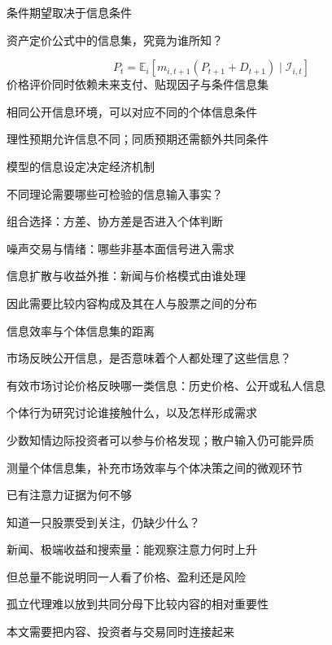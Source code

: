 \documentclass[11pt,compress]{beamer}
\begin{document}
\begin{frame}{条件期望取决于信息条件}\relax
{\small\color{tsinghua}资产定价公式中的信息集，究竟为谁所知？\par}\medskip
\begin{equation*}P_t=\mathbb E_i[m_{i,t+1}(P_{t+1}+D_{t+1})\mid\mathcal I_{i,t}]\end{equation*}\medskip
价格评价同时依赖未来支付、贴现因子与条件信息集\par\medskip
相同公开信息环境，可以对应不同的个体信息条件\par\medskip
理性预期允许信息不同；同质预期还需额外共同条件\par\medskip
{}
\end{frame}
\begin{frame}{模型的信息设定决定经济机制}\relax
{\small\color{tsinghua}不同理论需要哪些可检验的信息输入事实？\par}\medskip
组合选择：方差、协方差是否进入个体判断\par\medskip
噪声交易与情绪：哪些非基本面信号进入需求\par\medskip
信息扩散与收益外推：新闻与价格模式由谁处理\par\medskip
因此需要比较内容构成及其在人与股票之间的分布\par\medskip
{}
\end{frame}
\begin{frame}{信息效率与个体信息集的距离}\relax
{\small\color{tsinghua}市场反映公开信息，是否意味着个人都处理了这些信息？\par}\medskip
有效市场讨论价格反映哪一类信息：历史价格、公开或私人信息\par\medskip
个体行为研究讨论谁接触什么，以及怎样形成需求\par\medskip
少数知情边际投资者可以参与价格发现；散户输入仍可能异质\par\medskip
测量个体信息集，补充市场效率与个体决策之间的微观环节\par\medskip
{}
\end{frame}
\begin{frame}{已有注意力证据为何不够}\relax
{\small\color{tsinghua}知道一只股票受到关注，仍缺少什么？\par}\medskip
新闻、极端收益和搜索量：能观察注意力何时上升\par\medskip
但总量不能说明同一人看了价格、盈利还是风险\par\medskip
孤立代理难以放到共同分母下比较内容的相对重要性\par\medskip
本文需要把内容、投资者与交易同时连接起来\par\medskip
{}
\end{frame}
\end{document}
